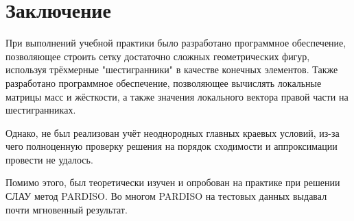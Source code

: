 \chapter*{Заключение}


При выполнений учебной практики было разработано программное обеспечение, позволяющее строить сетку достаточно сложных геометрических фигур, используя трёхмерные "шестигранники" в качестве конечных элементов. Также разработано программное обеспечение, позволяющее вычислять локальные матрицы масс и жёсткости, а также значения локального вектора правой части на шестигранниках. 

Однако, не был реализован учёт неоднородных главных краевых условий, из-за чего полноценную проверку решения на порядок сходимости и аппроксимации провести не удалось.

Помимо этого, был теоретически изучен и опробован на практике при решении СЛАУ метод PARDISO. Во многом PARDISO на тестовых данных выдавал почти мгновенный результат. 
